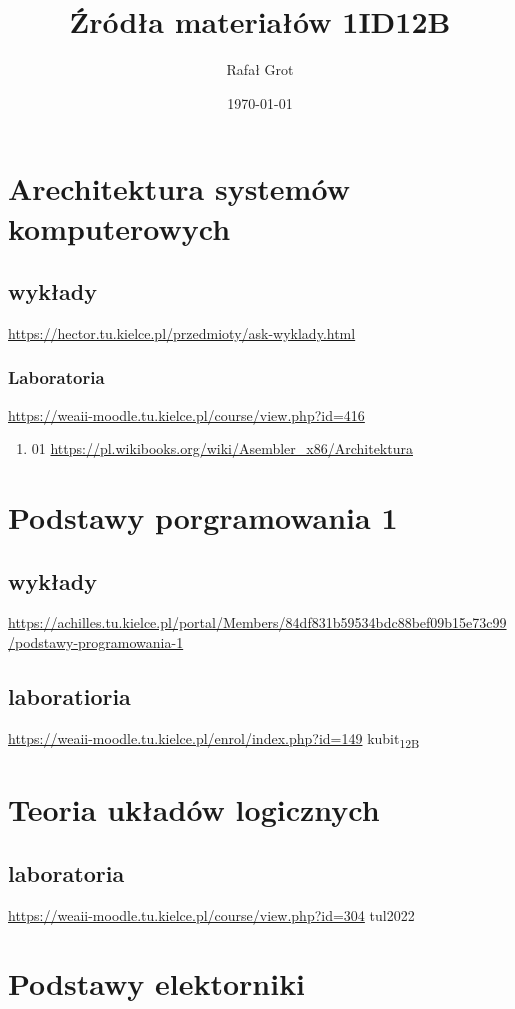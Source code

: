 \documentclass[11pt]{article}
\author{Rafał Grot}
\date{\today}
\title{Źródła materiałów 1ID12B}
\begin{document}
\maketitle
\tableofcontents


\section{Arechitektura systemów komputerowych}
\label{sec:org6225b5f}
\subsection{wykłady}
\label{sec:orge7c220b}
\url{https://hector.tu.kielce.pl/przedmioty/ask-wyklady.html}
\subsubsection{Laboratoria}
\label{sec:org9516c68}
\url{https://weaii-moodle.tu.kielce.pl/course/view.php?id=416}
\begin{enumerate}
\item 01
\label{sec:org0d659b4}
\url{https://pl.wikibooks.org/wiki/Asembler\_x86/Architektura}
\end{enumerate}
\section{Podstawy porgramowania 1}
\label{sec:orgeea360d}
\subsection{wykłady}
\label{sec:orga4039bd}
\url{https://achilles.tu.kielce.pl/portal/Members/84df831b59534bdc88bef09b15e73c99/podstawy-programowania-1}
\subsection{laboratioria}
\label{sec:orgf82d8d2}
\url{https://weaii-moodle.tu.kielce.pl/enrol/index.php?id=149} kubit\textsubscript{12B}
\section{Teoria układów logicznych}
\label{sec:org63b93ea}
\subsection{laboratoria}
\label{sec:orgdc2440a}
\url{https://weaii-moodle.tu.kielce.pl/course/view.php?id=304} tul2022
\section{Podstawy elektorniki}
\label{sec:orga67ae37}
\end{document}
